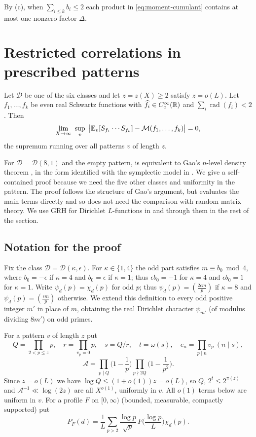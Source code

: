 \documentclass[11pt,colorlinks]{charlie}
\newcommand{\rad}{\operatorname{rad}}
\newcommand{\cD}{\mathcal{D}}
\newcommand{\cA}{\mathcal{A}}
\newcommand{\cM}{\mathcal{M}}
\begin{document}
By (c), when $\sum_{i\le k}b_i\le2$ each product in \eqref{eq:moment-cumulant} contains at most one nonzero factor $\Delta$.

\section{Restricted correlations in prescribed patterns}\label{sec:arith}

\begin{theorem}\label{thm:correlations}
Let $\cD$ be one of the six classes and let $z=z(X)\ge2$ satisfy $z=o(L)$. Let $f_1,\dots,f_k$ be even real Schwartz functions with $\widehat f_i\in C_c^\infty(\mathbb{R})$ and $\sum_i\rad(f_i)<2$. Then
\[
 \lim_{X\to\infty}\ \sup_v\ \big|\E_v[S_{f_1}\cdots S_{f_k}]-\cM(f_1,\dots,f_k)\big|=0,
\]
the supremum running over all patterns $v$ of length $z$.
\end{theorem}

For $\cD=\cD(8,1)$ and the empty pattern,  is equivalent to Gao's $n$-level density theorem \cite{Gao}, in the form identified with the symplectic model in \cite{ERR}. We give a self-contained proof because we need the five other classes and uniformity in the pattern. The proof follows the structure of Gao's argument, but evaluates the main terms directly and so does not need the comparison with random matrix theory. We use GRH for Dirichlet $L$-functions \cite{Alpoge} in  and through them in the rest of the section.

\subsection{Notation for the proof}\label{ssec:arith-notation}
Fix the class $\cD=\cD(\kappa,\epsilon)$. For $\kappa\in\{1,4\}$ the odd part satisfies $m\equiv b_0\bmod 4$, where $b_0=-\epsilon$ if $\kappa=4$ and $b_0=\epsilon$ if $\kappa=1$; thus $\epsilon b_0=-1$ for $\kappa=4$ and $\epsilon b_0=1$ for $\kappa=1$. Write $\psi_d(p)=\chi_d(p)$ for odd $p$; thus $\psi_d(p)=(\tfrac{2\epsilon m}{p})$ if $\kappa=8$ and $\psi_d(p)=(\tfrac{\epsilon m}p)$ otherwise. We extend this definition to every odd positive integer $m'$ in place of $m$, obtaining the real Dirichlet character $\psi_{m'}$ (of modulus dividing $8m'$) on odd primes.

For a pattern $v$ of length $z$ put
\[
 Q=\prod_{2<p\le z}p,\quad r=\prod_{v_p=0}p,\quad s=Q/r,\quad t=\omega(s),\quad e_n=\prod_{p\mid n}v_p\ (n\mid s),
\]
\[
 \cA=\prod_{p\mid Q}\Big(1-\frac1p\Big)\prod_{p\nmid2Q}\Big(1-\frac1{p^2}\Big).
\]
Since $z=o(L)$ we have $\log Q\le(1+o(1))z=o(L)$, so $Q$, $2^t\le2^{\pi(z)}$ and $\cA^{-1}\ll\log(2z)$ are all $X^{o(1)}$, uniformly in $v$. All $o(1)$ terms below are uniform in $v$. For a profile $F$ on $[0,\infty)$ (bounded, measurable, compactly supported) put
\[
 P_F(d)=\frac1L\sum_{p>2}\frac{\log p}{\sqrt p}\,F\Big(\frac{\log p}L\Big)\chi_d(p).
\]
\end{document}
